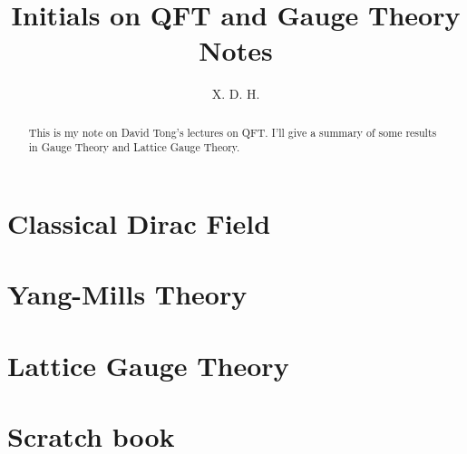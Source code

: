 \documentclass[12pt]{article}
\begin{document}
\title{\boldmath Initials on QFT and Gauge Theory Notes}
\author{X. D. H.}

\maketitle

\begin{abstract}
  This is my note on David Tong's lectures on QFT. I'll give a summary of some results in Gauge Theory and Lattice Gauge Theory.
\end{abstract}

\tableofcontents

\newpage 
\section{Classical Dirac Field}\label{sec:Classical Dirac Field} %


\newpage 
\section{Yang-Mills Theory}\label{sec:Yang-Mills Theory} %



\newpage 
\section{Lattice Gauge Theory}\label{sec:Lattice Gauge Theory} %


\section{Scratch book}\label{sec:Scratch book} %

\end{document}

